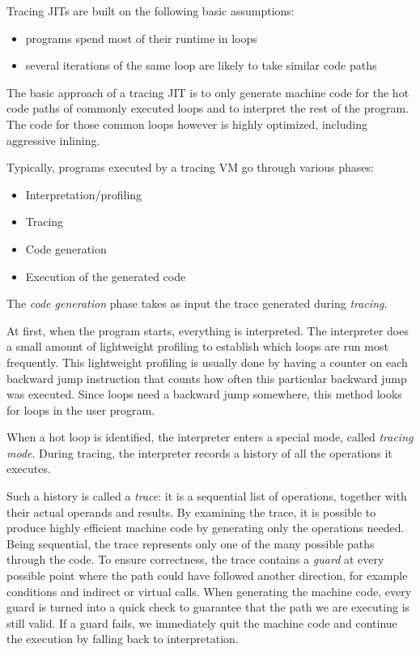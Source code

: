 \documentclass{sig-alternate}
\begin{document}
Tracing JITs are built on the following basic assumptions:
\begin{itemize}
 \item programs spend most of their runtime in loops
 \item several iterations of the same loop are likely to take similar code paths
\end{itemize}

The basic approach of a tracing JIT is to only generate machine code for the hot
code paths of commonly executed loops and to interpret the rest of the program.
The code for those common loops however is highly optimized, including
aggressive inlining.

Typically, programs executed by a tracing VM go through various phases:
\begin{itemize}
\item Interpretation/profiling
\item Tracing
\item Code generation
\item Execution of the generated code
\end{itemize}

The \emph{code generation} phase takes as input the trace generated during
\emph{tracing}.

At first, when the program starts, everything is interpreted.
The interpreter does a small amount of lightweight profiling to establish which loops
are run most frequently. This lightweight profiling is usually done by having a counter on
each backward jump instruction that counts how often this particular backward jump
was executed. Since loops need a backward jump somewhere, this method looks for
loops in the user program.

When a hot loop is identified, the interpreter enters a
special mode, called \emph{tracing mode}. During tracing, the interpreter
records a history of all the operations it executes.

Such a history is called a \emph{trace}: it is a sequential list of
operations, together with their actual operands and results.  By examining the
trace, it is possible to produce highly efficient machine code by generating
only the operations needed.  Being sequential, the trace represents only one
of the many possible paths through the code. To ensure correctness, the trace
contains a \emph{guard} at every possible point where the path could have
followed another direction, for example conditions and indirect or virtual
calls.  When generating the machine code, every guard is turned into a quick check
to guarantee that the path we are executing is still valid.  If a guard fails,
we immediately quit the machine code and continue the execution by falling
back to interpretation.
\end{document}

